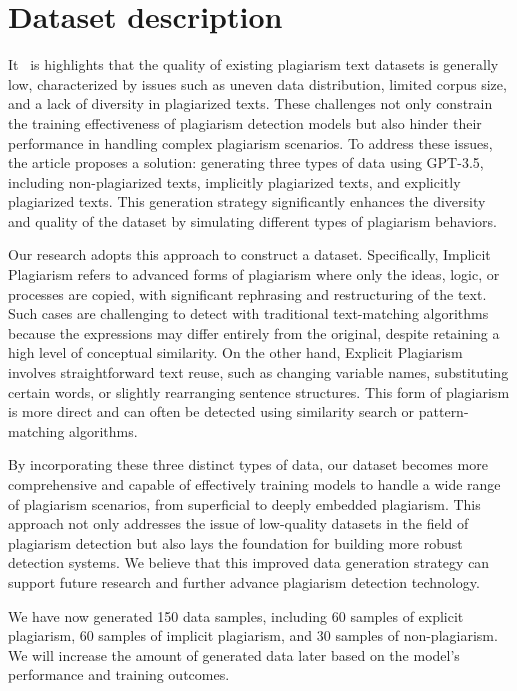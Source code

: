 \section{Dataset description}
It~\cite{yuanjibao} is highlights that the quality of existing plagiarism text datasets is generally low, characterized by issues such as uneven data distribution, limited corpus size, and a lack of diversity in plagiarized texts. These challenges not only constrain the training effectiveness of plagiarism detection models but also hinder their performance in handling complex plagiarism scenarios. To address these issues, the article proposes a solution: generating three types of data using GPT-3.5, including non-plagiarized texts, implicitly plagiarized texts, and explicitly plagiarized texts. This generation strategy significantly enhances the diversity and quality of the dataset by simulating different types of plagiarism behaviors.

Our research adopts this approach to construct a dataset. Specifically, Implicit Plagiarism refers to advanced forms of plagiarism where only the ideas, logic, or processes are copied, with significant rephrasing and restructuring of the text. Such cases are challenging to detect with traditional text-matching algorithms because the expressions may differ entirely from the original, despite retaining a high level of conceptual similarity. On the other hand, Explicit Plagiarism involves straightforward text reuse, such as changing variable names, substituting certain words, or slightly rearranging sentence structures. This form of plagiarism is more direct and can often be detected using similarity search or pattern-matching algorithms.

By incorporating these three distinct types of data, our dataset becomes more comprehensive and capable of effectively training models to handle a wide range of plagiarism scenarios, from superficial to deeply embedded plagiarism. This approach not only addresses the issue of low-quality datasets in the field of plagiarism detection but also lays the foundation for building more robust detection systems. We believe that this improved data generation strategy can support future research and further advance plagiarism detection technology.

We have now generated 150 data samples, including 60 samples of explicit plagiarism, 60 samples of implicit plagiarism, and 30 samples of non-plagiarism. We will increase the amount of generated data later based on the model's performance and training outcomes.